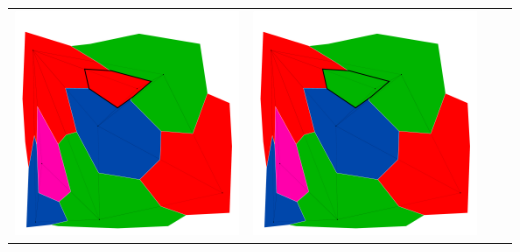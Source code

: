 \documentclass[10pt,a4paper]{article}
\begin{document}
\begin{tabular}{c c c c }
	\includegraphics[scale=.10]{../results/backtracking_simple/map_build/bt_simple_I00017.pdf}&
	\includegraphics[scale=.10]{../results/backtracking_simple/map_build/bt_simple_I00018.pdf}&

\end{tabular}
\end{document}
